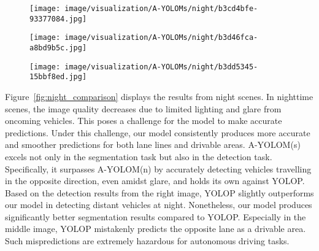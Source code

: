\documentclass[lettersize,journal]{IEEEtran}
\begin{document}
\begin{figure*}[!h]
    \begin{subfigure}[b]{0.05\textwidth}
        \centering
        \vspace{0.1cm}
    \end{subfigure}\begin{subfigure}{0.25\textwidth}
        \centering
        \texttt{[image: image/visualization/A-YOLOMs/night/b3cd4bfe-93377084.jpg]}
    \end{subfigure}\hspace{0.5cm}
    \begin{subfigure}{0.25\textwidth}
        \centering
        \texttt{[image: image/visualization/A-YOLOMs/night/b3d46fca-a8bd9b5c.jpg]}
    \end{subfigure}\hspace{0.5cm}
    \begin{subfigure}{0.25\textwidth}
        \centering
        \texttt{[image: image/visualization/A-YOLOMs/night/b3dd5345-15bbf8ed.jpg]}
    \end{subfigure}
    \caption{Visual Comparison of Results at Night}
    \label{fig:night_comparison}
\end{figure*}

Figure~\ref{fig:night_comparison} displays the results from night scenes. In nighttime scenes, the image quality decreases due to limited lighting and glare from oncoming vehicles. This poses a challenge for the model to make accurate predictions. Under this challenge, our model consistently produces more accurate and smoother predictions for both lane lines and drivable areas. A-YOLOM(s) excels not only in the segmentation task but also in the detection task. Specifically, it surpasses A-YOLOM(n) by accurately detecting vehicles travelling in the opposite direction, even amidst glare, and holds its own against YOLOP. Based on the detection results from the right image, YOLOP slightly outperforms our model in detecting distant vehicles at night. Nonetheless, our model produces significantly better segmentation results compared to YOLOP. Especially in the middle image, YOLOP mistakenly predicts the opposite lane as a drivable area. Such mispredictions are extremely hazardous for autonomous driving tasks. 
\end{document}
